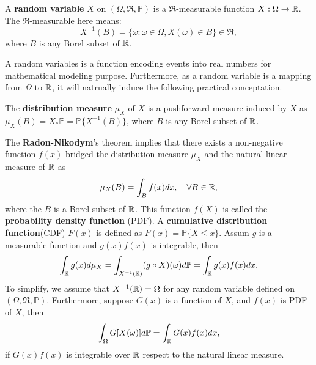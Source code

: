 \begin{definition}
A \textbf{random variable} $X$ on $(\Omega,\mathfrak{R},\mathbb{P})$ is a $\mathfrak{R}$-measurable function $X:\Omega\to\mathbb{R}$. The $\mathfrak{R}$-measurable here means:
	\begin{equation}
		X^{-1}(B)=\{\omega:\omega\in\Omega, X(\omega)\in B\}\in\mathfrak{R},
	\end{equation}
where $B$ is any Borel subset of $\mathbb{R}$.
\end{definition}
A random variables is a function encoding events into real numbers for mathematical modeling purpose. Furthermore, as a random variable is a mapping from $\Omega$ to $\mathbb{R}$, it will natrually induce the following practical conceptation.

\begin{definition}
The \textbf{distribution measure} $\mu_X$ of $X$ is a pushforward measure induced by $X$ as $\mu_X(B)=X_*\mathbb{P}=\mathbb{P}\{X^{-1}(B)\}$, where $B$ is any Borel subset of $\mathbb{R}$.
\end{definition}
The \textbf{Radon-Nikodym}'s theorem implies that there exists a non-negative function $f(x)$ bridged the distribution measure $\mu_X$ and the natural linear measure of $\mathbb{R}$ as
\begin{equation}
\mu_X(B) = \int_B f(x)d x, \quad\forall B\in\mathbb{R},
\end{equation} 
where the $B$ is a Borel subset of $\mathbb{R}$. This function $f(X)$ is called the \textbf{probability density function} (PDF). A \textbf{cumulative distribution function}(CDF) $F(x)$ is defined as $F(x)=\mathbb{P}\{X\le x\}$.
Assum $g$ is a measurable function and $g(x)f(x)$ is integrable, then
\begin{equation}
\int_{\mathbb{R}} g(x)d\mu_X=\int_{X^{-1}(\mathbb{R})}(g\circ X)(\omega)d\mathbb{P}=\int_{\mathbb{R}} g(x)f(x)dx.
\end{equation}
To simplify, we assume that $X^{-1}(\mathbb{R})=\Omega$ for any random variable defined on $(\Omega,\mathfrak{R},\mathbb{P})$. Furthermore, suppose $G(x)$ is a function of $X$, and $f(x)$ is PDF of $X$, then
\begin{equation}
\int_\Omega G[X(\omega)]d\mathbb{P} = \int_{\mathbb{R}} G(x)f(x)dx,
\label{eq:expectation_representation}
\end{equation}
if $G(x)f(x)$ is integrable over $\mathbb{R}$ respect to the natural linear measure.

